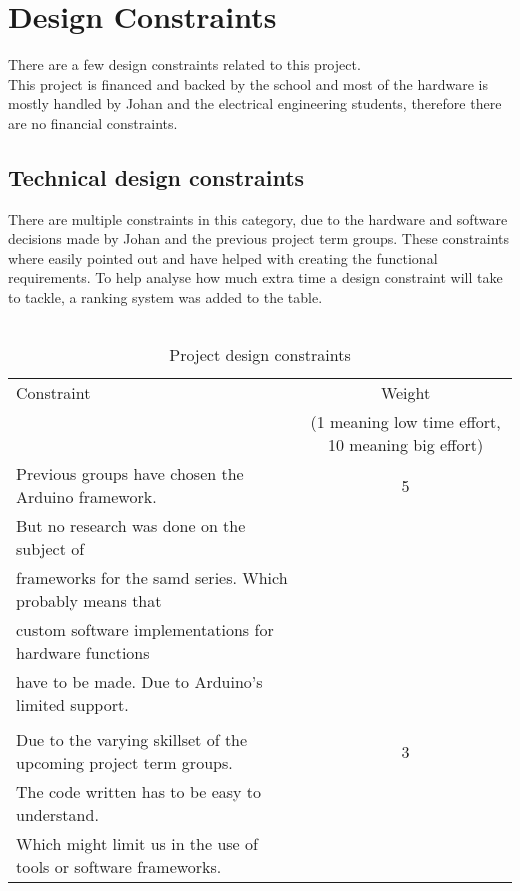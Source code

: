 \section{Design Constraints}
There are a few design constraints related to this project.\\ This project is financed and backed by the school and most of the hardware is mostly handled by Johan and the electrical engineering students, therefore there are no financial constraints.
\subsection{Technical design constraints}
There are multiple constraints in this category, due to the hardware and software decisions made by Johan and the previous project term groups. These constraints where easily pointed out and have helped with creating the functional requirements. To help analyse how much extra time a design constraint will take to tackle, a ranking system was added to the table.\\\\
\begin{table}[!hb]
\begin{tabular}{|l|c|}
\hline
    Constraint & Weight \\
               & (1 meaning low time effort, 10 meaning big effort) \\
    \hline\hline
     Previous groups have chosen the Arduino framework. & 5\\
     But no research was done on the subject of \\frameworks for the samd series. Which probably means that \\ custom software implementations for hardware functions \\have to be made. Due to Arduino's limited support.\\ & \\
     \hline
     Due to the varying skillset of the upcoming project term groups. & 3\\
     The code written has to be easy to understand. \\ Which might limit us in the use of tools or software frameworks.\\
     \hline
\end{tabular}
 \caption{Project design constraints}
 \label{tab:functional_requirements}
\end{table}